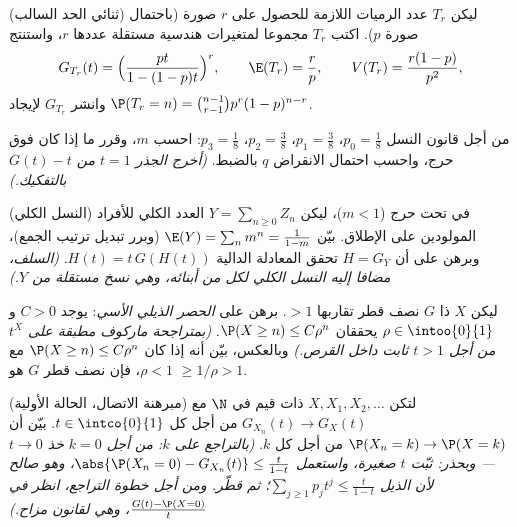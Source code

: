\begin{exercise}[$\star\star$]\label{exo:b2:genfun:5}
(ثنائي الحد السالب) ليكن $T_r$ عدد الرميات اللازمة للحصول على
$r$ صورة (باحتمال صورة $p$). اكتب $T_r$ مجموعا لمتغيرات
هندسية مستقلة عددها $r$، واستنتج
\[
G_{T_r}(t) = \Bigl(\frac{pt}{1 - (1-p)t}\Bigr)^{r},
\qquad
\E(T_r) = \frac rp,
\qquad
V(T_r) = \frac{r(1-p)}{p^2},
\]
وانشر $G_{T_r}$ لإيجاد $\P(T_r = n) = \binom{n-1}{r-1}
p^r(1-p)^{n-r}$.
\end{exercise}

\begin{exercise}[$\star\star$]\label{exo:b2:genfun:6}
من أجل قانون النسل $p_0 = \frac18$، $p_1 = \frac38$، $p_2 =
\frac38$، $p_3 = \frac18$: احسب $m$،
وقرر ما إذا كان فوق حرج، واحسب احتمال الانقراض $q$ بالضبط.
\emph{(أخرج الجذر $t = 1$ من $G(t) - t$ بالتفكيك.)}
\end{exercise}

\begin{exercise}[$\star\star\star$]\label{exo:b2:genfun:7}
(النسل الكلي) في  تحت حرج ($m < 1$)، ليكن $Y = \sum_{n\geq0} Z_n$ العدد
الكلي للأفراد المولودين على الإطلاق. بيّن $\E(Y) = \sum_n m^n = \frac{1}{1 - m}$ (وبرر تبديل ترتيب
الجمع)، وبرهن على أن  $H = G_Y$ تحقق المعادلة الدالية
$H(t) = t\,G(H(t))$. \emph{(السلف، مضافا إليه النسل الكلي لكل من أبنائه، وهي
نسخ مستقلة من $Y$.)}
\end{exercise}

\begin{exercise}[$\star\star\star$]\label{exo:b2:genfun:8}
ليكن $X$ ذا  $G$ نصف قطر تقاربها $>
1$. برهن على
\emph{الحصر الذيلي الأسي}: يوجد $C > 0$ و$\rho \in \intoo{0}{1}$ يحققان $\P(X \geq n) \leq C\rho^n$.
\emph{(بمتراجحة ماركوف مطبقة على $t^X$ من أجل $t > 1$ ثابت داخل
القرص.)} وبالعكس، بيّن أنه إذا كان $\P(X \geq n) \leq C\rho^n$ مع $\rho < 1$، فإن نصف قطر
$G$ هو $\geq 1/\rho > 1$.
\end{exercise}

\begin{exercise}[$\star\star\star$]\label{exo:b2:genfun:9}
(مبرهنة الاتصال، الحالة الأولية) لتكن $X, X_1, X_2, \dots$ ذات قيم في $\N$
مع $G_{X_n}(t) \to G_X(t)$ من أجل كل $t \in
\intco{0}{1}$. بيّن أن $\P(X_n = k) \to \P(X = k)$ من أجل كل $k$.
\emph{(بالتراجع على $k$: من أجل $k = 0$ خذ $t \to 0$ --- وبحذر:
ثبّت $t$ صغيرة، واستعمل $\abs{\P(X_n = 0) - G_{X_n}(t)}
\leq \frac{t}{1-t}$، وهو صالح لأن الذيل $\sum_{j \geq 1}p_jt^j
\leq \frac{t}{1 - t}$؛ ثم
قطّر. ومن أجل خطوة التراجع، انظر في $\frac{G(t) - \P(X = 0)}{t}$، وهي 
لقانون مزاح.)}
\end{exercise}

